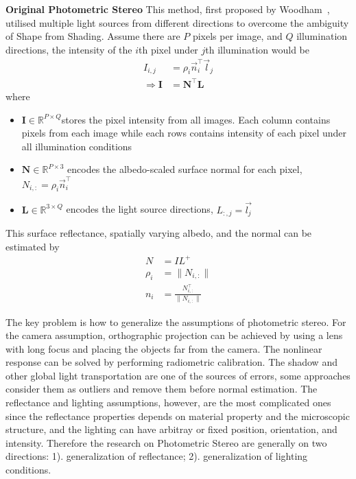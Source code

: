 \textbf{Original Photometric Stereo} This method, first proposed by Woodham~\cite{woodham1980photometric}, utilised multiple light sources from different directions to overcome the ambiguity of Shape from Shading. Assume there are $P$ pixels per image, and $Q$ illumination directions, the intensity of the $i$th pixel under $j$th illumination would be
\begin{align*}
I_{i,j} &= \rho_i\vec{n}_i^\top \vec{l}_j\\
\Rightarrow\mathbf{I} &= \mathbf{N}^\top \mathbf{L}
\end{align*}
where
\begin{itemize}
\item $\mathbf{I}\in \mathbb{R}^{P\times Q} $stores the pixel intensity from all images. Each column contains pixels from each image while each rows contains intensity of each pixel under all illumination conditions
\item $\mathbf{N}\in \mathbb{R}^{P\times3}$ encodes the albedo-scaled surface normal for each pixel, \ie $N_{i, :} = \rho_i\vec{n}_i^\top$
\item $\mathbf{L} \in \mathbb{R}^{3\times Q}$ encodes the light source directions, \ie $L_{:, j} = \vec{l_j}$
\end{itemize}
This surface reflectance, \ie spatially varying albedo, and the normal can be estimated by
\begin{align*}
N &= IL^{+}\\
\rho_i &= \|N_{i,:}\|\\
n_i &= \frac{N_{i,:}^\top}{\|N_{i,:}\|}
\end{align*}

The key problem is how to generalize the assumptions of photometric stereo. For the camera assumption, orthographic projection can be achieved by using a lens with long focus and placing the objects far from the camera. The nonlinear response can be solved by performing radiometric calibration. The shadow and other global light transportation are one of the sources of errors, some approaches consider them as outliers and remove them before normal estimation. The reflectance and lighting assumptions, however, are the most complicated ones since the reflectance properties depends on material property and the microscopic structure, and the lighting can have arbitray or fixed position, orientation, and intensity. Therefore the research on Photometric Stereo are generally on two directions: 1). generalization of reflectance; 2). generalization of lighting conditions.

